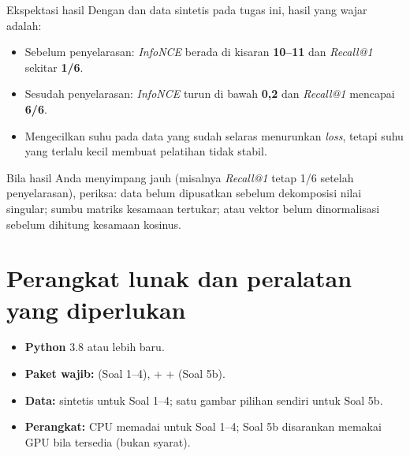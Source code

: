 \documentclass[12pt, a4paper]{article}
\begin{document}
\begin{minipage}{\linewidth}
\begin{bclogo}[couleur=ctpMantle, arrondi=0.1, logo=\bcinfo, ombre=false, couleurBord=ctpSurface, epBord=0.6]{Ekspektasi hasil}
  Dengan  dan data sintetis pada tugas ini, hasil yang wajar adalah:

  \begin{itemize}[itemsep=1pt,parsep=0pt,topsep=2pt,partopsep=0pt]
    \item Sebelum penyelarasan: \emph{InfoNCE} berada di kisaran \textbf{10--11} dan \emph{Recall@1} sekitar \textbf{1/6}.
    \item Sesudah penyelarasan: \emph{InfoNCE} turun di bawah \textbf{0,2} dan \emph{Recall@1} mencapai \textbf{6/6}.
    \item Mengecilkan suhu pada data yang sudah selaras menurunkan \emph{loss}, tetapi suhu yang terlalu kecil membuat pelatihan tidak stabil.
  \end{itemize}

  Bila hasil Anda menyimpang jauh (misalnya \emph{Recall@1} tetap 1/6 setelah penyelarasan), periksa: data belum dipusatkan sebelum dekomposisi nilai singular; sumbu matriks kesamaan tertukar; atau vektor belum dinormalisasi sebelum dihitung kesamaan kosinus.
\end{bclogo}
\end{minipage}

\section{Perangkat lunak dan peralatan yang diperlukan}\label{sec:requiredsw}

\begin{itemize}[itemsep=2pt,parsep=0pt,topsep=2pt,partopsep=2pt]
  \item[\color{ctpBlue}\faPython] \textbf{Python} 3.8 atau lebih baru.
  \item[\color{ctpBlue}\faFileCode] \textbf{Paket wajib:}  (Soal 1--4),  +  +  (Soal 5b).
  \item[\color{ctpBlue}\faDownload] \textbf{Data:} sintetis untuk Soal 1--4; satu gambar pilihan sendiri untuk Soal 5b.
  \item[\color{ctpBlue}\faFileCode] \textbf{Perangkat:} CPU memadai untuk Soal 1--4; Soal 5b disarankan memakai GPU bila tersedia (bukan syarat).
\end{itemize}
\end{document}
